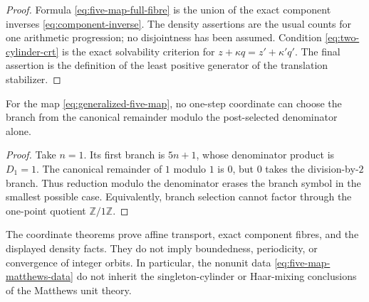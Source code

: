 \begin{proof}
Formula \eqref{eq:five-map-full-fibre} is the union of the exact component
inverses \eqref{eq:component-inverse}.  The density assertions are the usual
counts for one arithmetic progression; no disjointness has been assumed.
Condition \eqref{eq:two-cylinder-crt} is the exact solvability criterion for
$z+\kappa q=z'+\kappa'q'$.  The final assertion is the definition of the
least positive generator of the translation stabilizer.
\end{proof}

\begin{proposition}
\label{prop:denominator-obstruction}
For the map \eqref{eq:generalized-five-map}, no one-step coordinate can choose
the branch from the canonical remainder modulo the post-selected denominator
alone.
\end{proposition}

\begin{proof}
Take $n=1$.  Its first branch is $5n+1$, whose denominator product is
$D_1=1$.  The canonical remainder of $1$ modulo $1$ is $0$, but $0$ takes
the division-by-$2$ branch.  Thus reduction modulo the denominator erases the
branch symbol in the smallest possible case.  Equivalently, branch selection
cannot factor through the one-point quotient $\mathbb Z/1\mathbb Z$.
\end{proof}

\begin{nonclaim}
The coordinate theorems prove affine transport, exact component fibres, and
the displayed density facts.  They do not imply boundedness, periodicity, or
convergence of integer orbits.  In particular, the nonunit data
\eqref{eq:five-map-matthews-data} do not inherit the singleton-cylinder or
Haar-mixing conclusions of the Matthews unit theory.
\end{nonclaim}
